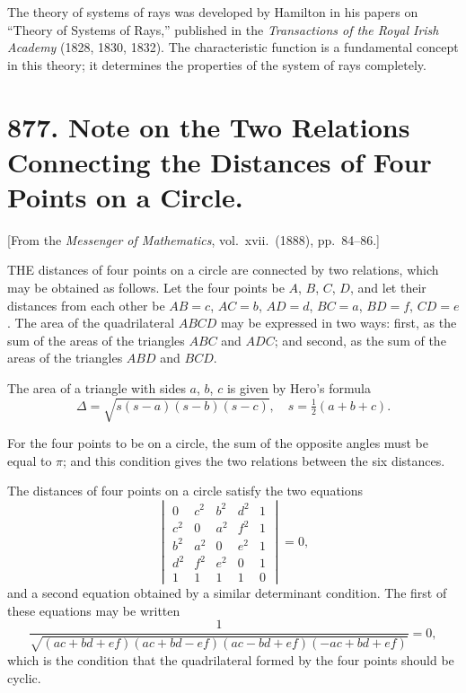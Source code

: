 \documentclass[12pt,a4paper]{article}
\theoremstyle{plain}
\begin{document}
The theory of systems of rays was developed by Hamilton in his papers on ``Theory of Systems of Rays,'' published in the \textit{Transactions of the Royal Irish Academy} (1828, 1830, 1832). The characteristic function is a fundamental concept in this theory; it determines the properties of the system of rays completely.

\newpage
\section[877]{877. Note on the Two Relations Connecting the Distances of Four Points on a Circle.}
\label{sec:877}

[From the \textit{Messenger of Mathematics}, vol.\ xvii.\ (1888), pp.\ 84--86.]

\medskip\noindent
THE distances of four points on a circle are connected by two relations, which may be obtained as follows. Let the four points be $A$, $B$, $C$, $D$, and let their distances from each other be $AB = c$, $AC = b$, $AD = d$, $BC = a$, $BD = f$, $CD = e$. The area of the quadrilateral $ABCD$ may be expressed in two ways: first, as the sum of the areas of the triangles $ABC$ and $ADC$; and second, as the sum of the areas of the triangles $ABD$ and $BCD$.

The area of a triangle with sides $a$, $b$, $c$ is given by Hero's formula
\[
\Delta = \sqrt{s(s-a)(s-b)(s-c)}, \quad s = \tfrac{1}{2}(a+b+c).
\]

For the four points to be on a circle, the sum of the opposite angles must be equal to $\pi$; and this condition gives the two relations between the six distances.

\medskip\noindent
The distances of four points on a circle satisfy the two equations
\[
\begin{vmatrix}
0 & c^{2} & b^{2} & d^{2} & 1 \\
c^{2} & 0 & a^{2} & f^{2} & 1 \\
b^{2} & a^{2} & 0 & e^{2} & 1 \\
d^{2} & f^{2} & e^{2} & 0 & 1 \\
1 & 1 & 1 & 1 & 0
\end{vmatrix} = 0,
\]
and a second equation obtained by a similar determinant condition. The first of these equations may be written
\[
\frac{1}{\sqrt{(ac+bd+ef)(ac+bd-ef)(ac-bd+ef)(-ac+bd+ef)}} = 0,
\]
which is the condition that the quadrilateral formed by the four points should be cyclic.
\end{document}

